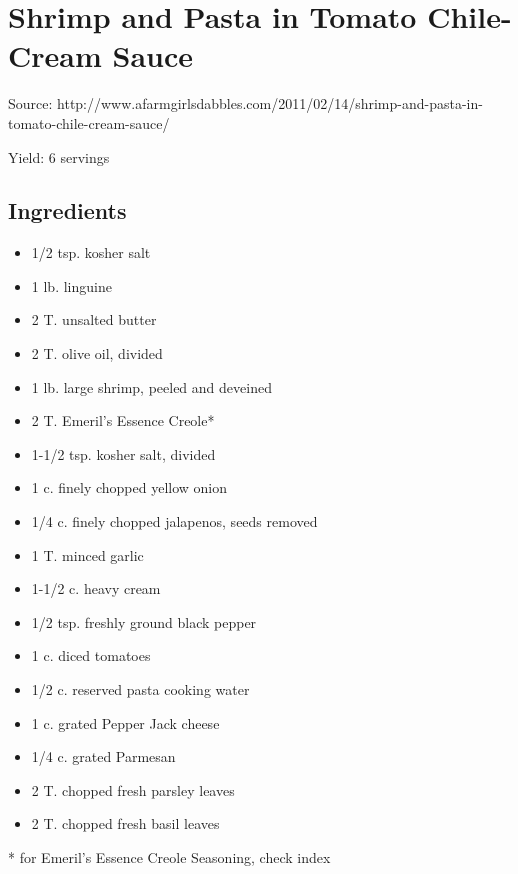 \section{Shrimp and Pasta in Tomato Chile-Cream Sauce}

Source: http://www.afarmgirlsdabbles.com/2011/02/14/shrimp-and-pasta-in-tomato-chile-cream-sauce/

\begin{center}
Yield: 6 servings
\end{center}

\subsection{Ingredients}
\begin{multicols}{2}
\begin{itemize}
    \item 1/2 tsp. kosher salt
    \item 1 lb. linguine
    \item 2 T. unsalted butter
    \item 2 T. olive oil, divided
    \item 1 lb. large shrimp, peeled and deveined
    \item 2 T. Emeril's Essence Creole*
    \item 1-1/2 tsp. kosher salt, divided
    \item 1 c. finely chopped yellow onion
    \item 1/4 c. finely chopped jalapenos, seeds removed
    \item 1 T. minced garlic
    \item 1-1/2 c. heavy cream
    \item 1/2 tsp. freshly ground black pepper
    \item 1 c. diced tomatoes
    \item 1/2 c. reserved pasta cooking water
    \item 1 c. grated Pepper Jack cheese
    \item 1/4 c. grated Parmesan
    \item 2 T. chopped fresh parsley leaves
    \item 2 T. chopped fresh basil leaves
\end{itemize}
\end{multicols}

* for Emeril's Essence Creole Seasoning, check index


